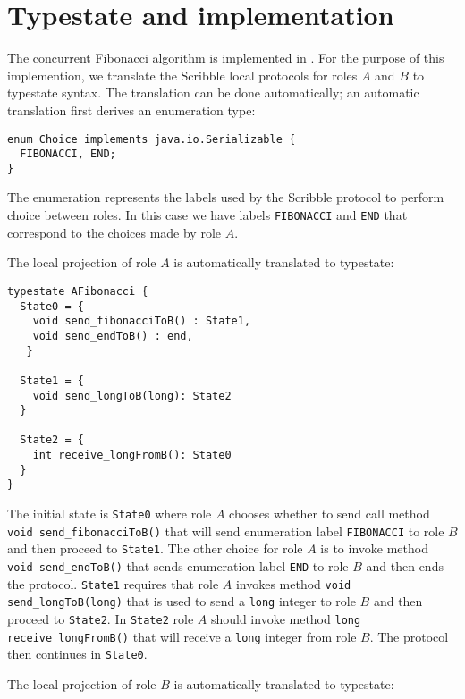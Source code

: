 \section{Typestate and \Mungo implementation}

The concurrent Fibonacci algorithm is implemented in \Mungo.
For the purpose of this implemention,
we translate the Scribble local protocols for roles
$A$ and $B$ to \Mungo typestate syntax.
The translation can be done automatically;
an automatic translation first derives an
enumeration type:

\begin{lstlisting}[caption={Enumeration for the communication choice}]
enum Choice implements java.io.Serializable {
  FIBONACCI, END;
}
\end{lstlisting}

The enumeration represents the
labels used by the Scribble protocol
to perform choice between roles. In this
case we have labels \lstinline|FIBONACCI| and
\lstinline|END| that correspond to the choices
made by role $A$.

The local projection of role $A$ is automatically translated to typestate:

\begin{lstlisting}[caption={Typestate for Role A}]
typestate AFibonacci {
  State0 = {
    void send_fibonacciToB() : State1,
    void send_endToB() : end,
   }

  State1 = {
    void send_longToB(long): State2
  }

  State2 = {
    int receive_longFromB(): State0
  }
}
\end{lstlisting}

The initial state is \lstinline|State0| where
role $A$ chooses whether to send call method
\lstinline|void send_fibonacciToB()| that
will send enumeration label \lstinline|FIBONACCI| to role $B$
and then proceed to \lstinline|State1|. The other
choice for role $A$ is to invoke method
\lstinline|void send_endToB()| that sends
enumeration label \lstinline|END| to role $B$
and then ends the protocol.
\lstinline|State1| requires that role $A$ invokes
method \lstinline|void send_longToB(long)| that
is used to send a \lstinline|long| integer to role
$B$ and then proceed to \lstinline|State2|. In 
\lstinline|State2| role $A$ should invoke method
\lstinline|long receive_longFromB()| that will
receive a \lstinline|long| integer from role $B$.
The protocol then continues in \lstinline|State0|.


The local projection of role $B$ is automatically translated to typestate:

